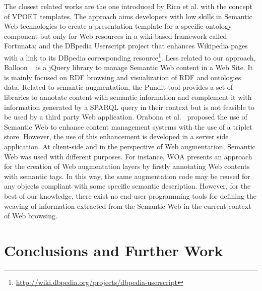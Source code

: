 \documentclass[runningheads]{llncs}
\newcommand{\SWAT}{SWAF}
\begin{document}
The closest related works are the one introduced by Rico et al.\cite{Rico2012AData} with the concept of VPOET templates. The approach aims developers with low skills in Semantic Web technologies to create a presentation template for a specific ontology component but only for Web resources in a wiki-based framework called Fortunata; and the DBpedia Userscript project that enhances Wikipedia pages with a link to its DBpedia corresponding resource\footnote{\url{http://wiki.dbpedia.org/projects/dbpedia-userscript}}. Less related to our approach, Balloon  ~\cite{Schlegel2014BalloonWebsite} is a jQuery library to manage Semantic Web content in a Web Site. It is mainly focused on RDF browsing and visualization of RDF and ontologies data. Related to semantic augmentation, the Pundit\cite{Grassi2013Pundit:Semantics} tool provides a set of libraries to annotate content with semantic information and complement it with information generated by a SPARQL query in their context but is not feasible to be used by a third party Web application. Orabona et al.~\cite{Orabona2015AnPortals.} proposed the use of Semantic Web to enhance content management systems with the use of a triplet store. However, the use of this enhancement is developed in a server side application. 
At client-side and in the perspective of Web augmentation, Semantic Web was used with different purposes. For instance, WOA \cite{DBLP:conf/icwe/FirmenichBRWB16} presents an approach for the creation of Web augmentation layers by firstly annotating Web contents with semantic tags. In this way, the same augmentation code may be reused for any objects compliant with some specific semantic description. 
However, for the best of our knowledge, there exist no end-user programming tools for defining the weaving of information extracted from the Semantic Web in the current context of Web browsing.
 
\section{Conclusions and Further Work}
\label{sec-conclusions}

\end{document}
